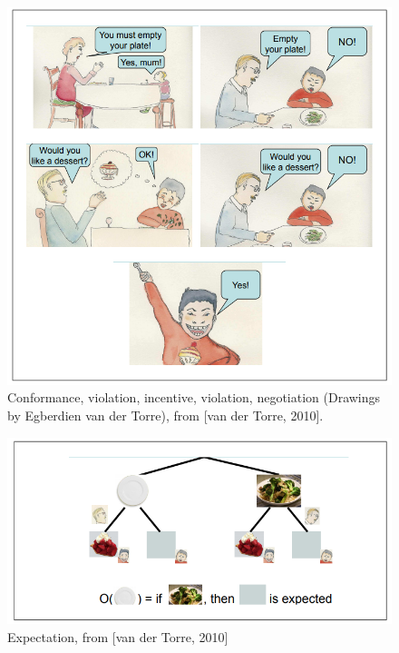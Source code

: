 \documentclass[conference]{hehe}
\begin{document}
\begin{center}
\begin{figure}[!htb]
    \centering
    \includegraphics[scale=0.6]{1.png}
    \caption{Conformance, violation, incentive, violation, negotiation (Drawings by
Egberdien van der Torre), from [van der Torre, 2010].}
    \label{fig:my_label}
\end{figure}
\end{center}

\begin{center}
\begin{figure}[!htb]
    \centering
    \includegraphics[scale=0.8]{2.png}
    \caption{Expectation, from [van der Torre, 2010]}
    \label{fig:my_label}
\end{figure}
\end{center}
\end{document}
